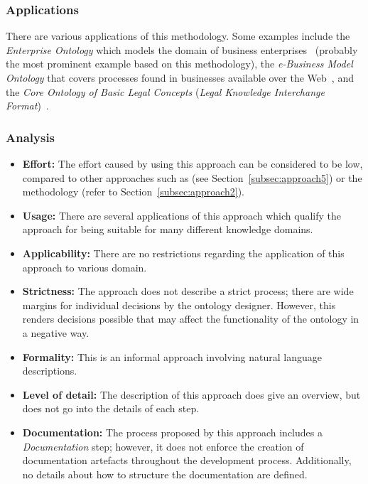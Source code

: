 \subsubsection{Applications}

There are various applications of this methodology. Some examples include the \emph{Enterprise Ontology} which models the domain of business enterprises~\cite{uschold_example1} (probably the most prominent example based on this methodology), the \emph{e-Business Model Ontology} that covers processes found in businesses available over the Web~\cite{uschold_example2}, and the \emph{ Core Ontology of Basic Legal Concepts} (\emph{Legal Knowledge Interchange Format})~\cite{uschold_example3}.

\subsubsection{Analysis}

\begin{itemize}
  \item \textbf{Effort:} The effort caused by using this approach can be considered to be low, compared to other approaches such as \methontology (see Section~\ref{subsec:approach5}) or the  methodology (refer to Section~\ref{subsec:approach2}).
  
   \item \textbf{Usage:} There are several applications of this approach which qualify the approach for being suitable for many different knowledge domains.
  
  \item \textbf{Applicability:} There are no restrictions regarding the application of this approach to various domain.
  
  \item \textbf{Strictness:} The approach does not describe a strict process; there are wide margins for individual decisions by the ontology designer. However, this renders decisions possible that may affect the functionality of the ontology in a negative way.
  
  \item \textbf{Formality:} This is an informal approach involving natural language descriptions.
  
  \item \textbf{Level of detail:} The description of this approach does give an overview, but does not go into the details of each step.
  
  \item \textbf{Documentation:} The process proposed by this approach includes a \emph{Documentation} step; however, it does not enforce the creation of documentation artefacts throughout the development process. Additionally, no details about how to structure the documentation are defined.
\end{itemize}

